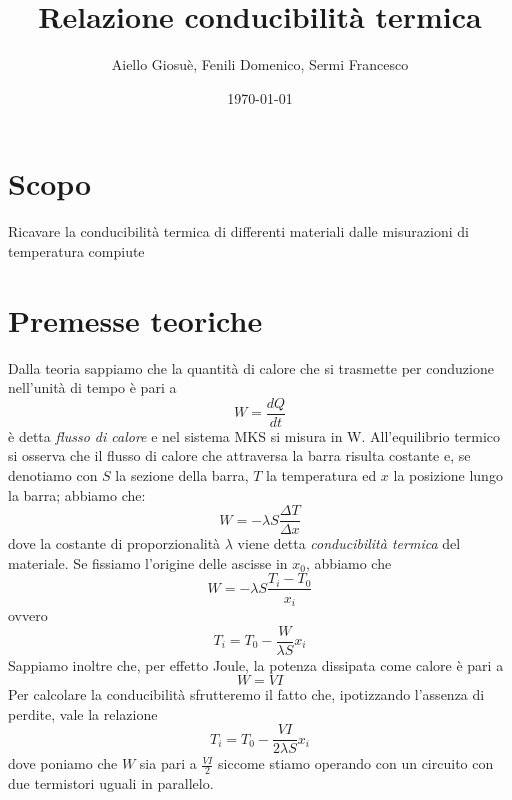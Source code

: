 \documentclass{article}
\author{Aiello Giosuè, Fenili Domenico, Sermi Francesco}
\date{\today}
\title{Relazione conducibilità termica}
\begin{document}
\maketitle
\newpage

\tableofcontents

\newpage

\section{Scopo}

Ricavare la conducibilità termica di differenti materiali dalle misurazioni di temperatura compiute

\section{Premesse teoriche}

Dalla teoria sappiamo che la quantità di calore che si trasmette per conduzione nell'unità di tempo è pari a
\begin{equation}
	W = \frac{dQ}{dt}
\end{equation}
è detta \emph{flusso di calore} e nel sistema MKS si misura in \unit{W}. All'equilibrio termico si osserva che il flusso di calore che attraversa la barra risulta costante e, se denotiamo con $S$ la sezione della barra, $T$ la temperatura ed $x$ la posizione lungo la barra; abbiamo che:
\begin{equation}
	W = -\lambda S \frac{\Delta T}{\Delta x}
\end{equation}
dove la costante di proporzionalità $\lambda$ viene detta \emph{conducibilità termica} del materiale. Se fissiamo l'origine delle ascisse in $x_0$, abbiamo che
\begin{equation}
	W = -\lambda S \frac{T_i - T_0}{x_i}
\end{equation}
ovvero
\begin{equation}
	T_i = T_0 - \frac{W}{\lambda S}x_i
\end{equation}
Sappiamo inoltre che, per effetto Joule, la potenza dissipata come calore è pari a
\begin{equation}
	W = VI
\end{equation}
Per calcolare la conducibilità sfrutteremo il fatto che, ipotizzando l'assenza di perdite, vale la relazione
\begin{equation}
	T_i = T_0 - \frac{VI}{2 \lambda S}x_i
	\label{eq:modello}
\end{equation}
dove poniamo che $W$ sia pari a $\frac{VI}{2}$ siccome stiamo operando con un circuito con due termistori uguali in parallelo.
\end{document}

